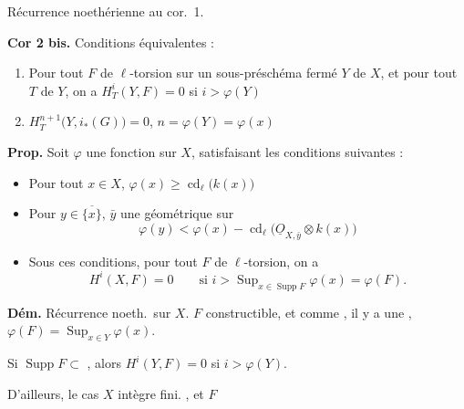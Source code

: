 \documentclass[11pt,a4paper]{article}
\begin{document}
Récurrence noethérienne \ill{} au cor.\ 1.

 \textbf{Cor 2 bis.} Conditions équivalentes :
\begin{enumerate}
\item[(i)] Pour tout $F$ de $\ell$-torsion sur un sous-préschéma fermé $Y$ de
  $X$, et pour tout $T$ de $Y$, on a $H^{i}_{T}(Y,F) = 0$ si
  $i > \varphi(Y)$
\item[(ii)] \ill{} \quad $H^{n+1}_{T}\bigl(Y, i_{*}(G)\bigr) = 0$, \quad
  $n = \varphi(Y) = \varphi(x)$
\end{enumerate}

 \textbf{Prop.} Soit $\varphi$ une fonction sur $X$,
\add{\ill{}} satisfaisant les conditions suivantes :
\begin{itemize}
\item[a)] Pour tout $x \in X$, \quad
  $\varphi(x) \geqslant \operatorname{cd}_{\ell}\bigl(k(x)\bigr)$
\item[b)] Pour  $y \in \overline{\{x\}}$, \quad
  $\bar{y}$ \struck{\ill{}} une \ill{} géométrique sur 
  \[
  \varphi(y) < \varphi(x) - \operatorname{cd}_{\ell}
  \bigl(\underline{O}_{X,\bar{y}} \otimes k(x)\bigr)
  \]
\item[c)] Sous ces conditions, pour tout $F$ de $\ell$-torsion, on a
  \[
  H^{i}(X,F) = 0 \qquad \text{si } i > \operatorname{Sup}_{x \in
  \operatorname{Supp} F} \varphi(x) = \varphi(F).
  \]
\end{itemize}


\textbf{Dém.} \struck{\ill{}} Récurrence noeth.\ sur $X$. \struck{\ill{}}
\ill{} $F$ constructible, et comme \ill{}, il y a une \ill{},
$\varphi(F) = \operatorname{Sup}_{x \in Y} \varphi(x)$. \ill{}

Si $\operatorname{Supp} F \subset$  \ill{}, alors
$H^{i}(Y,F) = 0$ si $i > \varphi(Y)$. \struck{\ill{}}

D'ailleurs, le cas \ill{} \ill{} $X$ intègre \ill{} fini. \ill{}, et $F$
\end{document}
